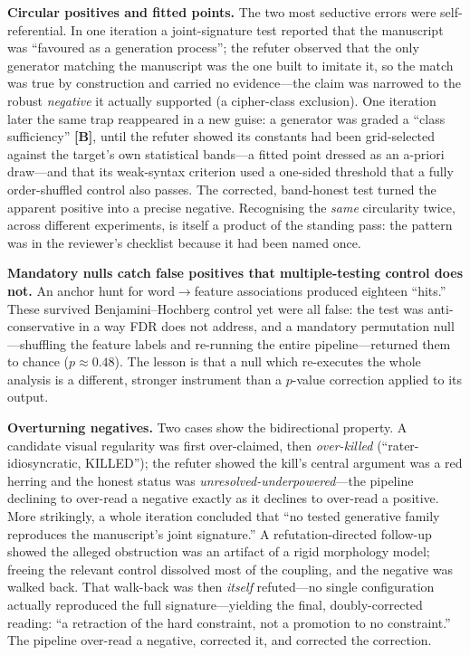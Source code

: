 \documentclass[11pt]{article}
\begin{document}
\textbf{Circular positives and fitted points.} The two most seductive errors were
self-referential. In one iteration a joint-signature test reported that the manuscript was
``favoured as a generation process''; the refuter observed that the only generator matching
the manuscript was the one built to imitate it, so the match was true by construction and
carried no evidence---the claim was narrowed to the robust \emph{negative} it actually
supported (a cipher-class exclusion). One iteration later the same trap reappeared in a new
guise: a generator was graded a ``class sufficiency'' \textbf{[B]}, until the refuter showed
its constants had been grid-selected against the target's own statistical bands---a fitted
point dressed as an a-priori draw---and that its weak-syntax criterion used a one-sided
threshold that a fully order-shuffled control also passes. The corrected, band-honest test
turned the apparent positive into a precise negative. Recognising the \emph{same} circularity
twice, across different experiments, is itself a product of the standing pass: the pattern
was in the reviewer's checklist because it had been named once.

\textbf{Mandatory nulls catch false positives that multiple-testing control does not.} An
anchor hunt for word$\rightarrow$feature associations produced eighteen ``hits.'' These
survived Benjamini--Hochberg control yet were all false: the test was anti-conservative in a
way FDR does not address, and a mandatory permutation null---shuffling the feature labels and
re-running the entire pipeline---returned them to chance ($p\approx0.48$). The lesson is that
a null which re-executes the whole analysis is a different, stronger instrument than a
$p$-value correction applied to its output.

\textbf{Overturning negatives.} Two cases show the bidirectional property. A candidate visual
regularity was first over-claimed, then \emph{over-killed} (``rater-idiosyncratic, KILLED'');
the refuter showed the kill's central argument was a red herring and the honest status was
\emph{unresolved-underpowered}---the pipeline declining to over-read a negative exactly as it
declines to over-read a positive. More strikingly, a whole iteration concluded that ``no
tested generative family reproduces the manuscript's joint signature.'' A refutation-directed
follow-up showed the alleged obstruction was an artifact of a rigid morphology model; freeing
the relevant control dissolved most of the coupling, and the negative was walked back. That
walk-back was then \emph{itself} refuted---no single configuration actually reproduced the
full signature---yielding the final, doubly-corrected reading: ``a retraction of the hard
constraint, not a promotion to no constraint.'' The pipeline over-read a negative, corrected
it, and corrected the correction.
\end{document}
